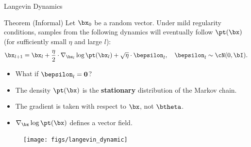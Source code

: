 \documentclass{beamer}
\begin{document}
\begin{frame}{Langevin Dynamics}
	\vspace{-0.4cm}
	\begin{block}{Theorem (Informal)}
		Let $\bx_0$ be a random vector. Under mild regularity conditions, samples from the following dynamics will eventually follow $\pt(\bx)$ (for sufficiently small $\eta$ and large $l$):
		\vspace{-0.3cm}
		\[
			\bx_{l + 1} = \bx_l + \frac{\eta}{2} \cdot \nabla_{\bx_l} \log \pt(\bx_l) + \sqrt{\eta} \cdot \bepsilon_l, \quad \bepsilon_l \sim \cN(0, \bI).
		\]
		\vspace{-0.5cm}
	\end{block}
	\eqpause
	\begin{minipage}{0.55\linewidth}
		\begin{itemize}
			\item What if $\bepsilon_l = \boldsymbol{0}$?
			\item The density $\pt(\bx)$ is the \textbf{stationary} distribution of the Markov chain.
			\item The gradient is taken with respect to $\bx$, not $\btheta$.
			\item $\nabla_{\bx} \log \pt(\bx)$ defines a vector field.
		\end{itemize}
	\end{minipage}%
	\begin{minipage}{0.45\linewidth}
		\begin{figure}
			\centering
			\texttt{[image: figs/langevin\_dynamic]}
		\end{figure}
	\end{minipage}
\end{frame}
\end{document}

